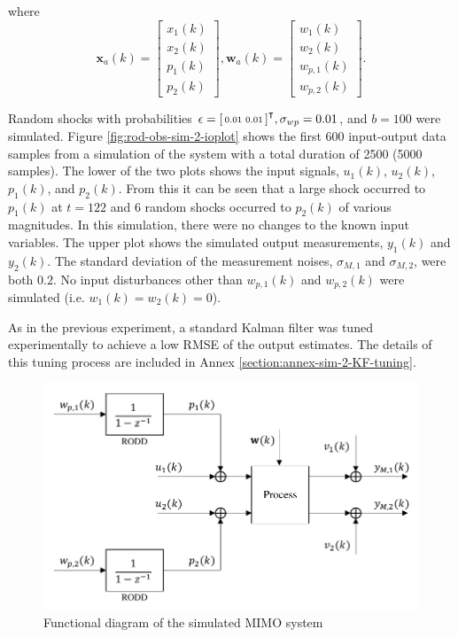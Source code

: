 where
\begin{equation} \label{eq:sim-sys-2x2-ss-aug2}
	\mathbf{x}_{a}(k) = \left[\begin{array}{l}
		x_{1}(k) \\
		x_{2}(k) \\
		p_{1}(k) \\
		p_{2}(k)
	\end{array}\right], \mathbf{w}_{a}(k) = \left[\begin{array}{l}
		w_1(k) \\
		w_2(k) \\
		w_{p,1}(k) \\
		w_{p,2}(k)
	\end{array}\right].
\end{equation}

Random shocks with probabilities $\epsilon=\begin{bsmallmatrix}0.01 & 0.01\end{bsmallmatrix}^\intercal, \sigma_{wp}=0.01$, and $b=100$ were simulated. Figure \ref{fig:rod-obs-sim-2-ioplot} shows the first 600 input-output data samples from a simulation of the system with a total duration of 2500 (5000 samples). The lower of the two plots shows the input signals, $u_1(k)$, $u_2(k)$, $p_1(k)$, and $p_2(k)$. From this it can be seen that a large shock occurred to $p_1(k)$ at $t=122$ and 6 random shocks occurred to $p_2(k)$ of various magnitudes. In this simulation, there were no changes to the known input variables. The upper plot shows the simulated output measurements, $y_1(k)$ and $y_2(k)$. The standard deviation of the measurement noises, $\sigma_{M,1}$ and $\sigma_{M,2}$, were both $0.2$. No input disturbances other than $w_{p,1}(k)$ and $w_{p,2}(k)$ were simulated (i.e. $w_1(k)=w_2(k)=0$).

As in the previous experiment, a standard Kalman filter was tuned experimentally to achieve a low \gls{RMSE} of the output estimates. The details of this tuning process are included in Annex \ref{section:annex-sim-2-KF-tuning}. 

\begin{figure}[htp]
	\centering
	\includegraphics[width=11.5cm]{images/sim-sys-diag-2x2.pdf}
	\caption{Functional diagram of the simulated MIMO system}
	\label{fig:sim-sys-diag-2x2}
\end{figure}

